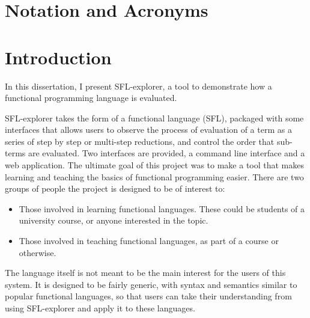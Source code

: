 \documentclass[
author={Kiran Sturt},
degree={BSc},
title={Implementing a Step by Step Evaluator for a Simple Functional Programming language},
unit={COMS30045},]{dissertation}
\theoremstyle{definition}
\theoremstyle{break}
\theoremstyle{definition}
\begin{document}
\chapter*{Notation and Acronyms}


%

\mainmatter


\chapter{Introduction}
\label{chap:context}

In this dissertation, I present SFL-explorer, a tool to demonstrate how a functional programming language is evaluated.

SFL-explorer takes the form of a functional language (SFL), packaged with some interfaces that allows users to observe the process of evaluation of a term as a series of step by step or multi-step reductions, and control the order that sub-terms are evaluated. Two interfaces are provided, a command line interface and a web application. The ultimate goal of this project was to make a tool that makes learning and teaching the basics of functional programming easier. There are two groups of people the project is designed to be of interest to:
\begin{itemize}
    \item Those involved in learning functional languages. These could be students of a university course, or anyone interested in the topic.
    \item Those involved in teaching functional languages, as part of a course or otherwise.
\end{itemize}

The language itself is not meant to be the main interest for the users of this system. It is designed to be fairly generic, with syntax and semantics similar to popular functional languages, so that users can take their understanding from using SFL-explorer and apply it to these languages. 
\end{document}
